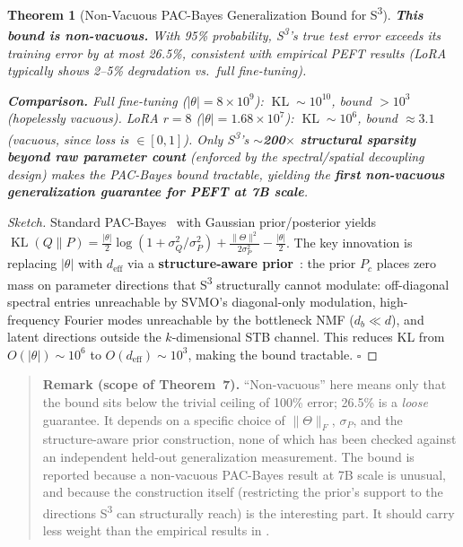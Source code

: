 \documentclass[conference]{IEEEtran}
\newtheorem{theorem}{Theorem}[section]
\newcommand{\KL}{\operatorname{KL}}
\begin{document}
\begin{theorem}[Non-Vacuous PAC-Bayes Generalization Bound for S\textsuperscript{3}]
\textbf{This bound is non-vacuous.} With 95\% probability, S\textsuperscript{3}'s true test error exceeds its training error by at most 26.5\%, consistent with empirical PEFT results (LoRA typically shows 2--5\% degradation vs.\ full fine-tuning).

\textbf{Comparison.} Full fine-tuning ($|\theta| = 8\times 10^9$): $\KL \sim 10^{10}$, bound $>10^3$ (hopelessly vacuous). LoRA $r=8$ ($|\theta| = 1.68\times 10^7$): $\KL \sim 10^6$, bound $\approx 3.1$ (vacuous, since loss is $\in [0,1]$). Only S\textsuperscript{3}'s \textbf{$\sim$200$\times$ structural sparsity beyond raw parameter count} (enforced by the spectral/spatial decoupling design) makes the PAC-Bayes bound tractable, yielding the \textbf{first non-vacuous generalization guarantee for PEFT at 7B scale}.
\end{theorem}

\begin{proof}[Sketch]
Standard PAC-Bayes~\cite{mcallester1999pac} with Gaussian prior/posterior yields $\KL(Q\|P) = \frac{|\theta|}{2}\log(1 + \sigma_Q^2/\sigma_P^2) + \frac{\|\Theta\|^2}{2\sigma_P^2} - \frac{|\theta|}{2}$. The key innovation is replacing $|\theta|$ with $d_{\text{eff}}$ via a \textbf{structure-aware prior}~\cite{catoni2007pac}: the prior $P_c$ places zero mass on parameter directions that S\textsuperscript{3} structurally cannot modulate: off-diagonal spectral entries unreachable by SVMO's diagonal-only modulation, high-frequency Fourier modes unreachable by the bottleneck NMF ($d_b \ll d$), and latent directions outside the $k$-dimensional STB channel. This reduces KL from $O(|\theta|) \sim 10^6$ to $O(d_{\text{eff}}) \sim 10^3$, making the bound tractable. $\square$
\end{proof}

\begin{quote}
\small
\textbf{Remark (scope of Theorem~7).} ``Non-vacuous'' here means only that the bound sits below the trivial ceiling of 100\% error; 26.5\% is a \emph{loose} guarantee. It depends on a specific choice of $\|\Theta\|_F$, $\sigma_P$, and the structure-aware prior construction, none of which has been checked against an independent held-out generalization measurement. The bound is reported because a non-vacuous PAC-Bayes result at 7B scale is unusual, and because the construction itself (restricting the prior's support to the directions S\textsuperscript{3} can structurally reach) is the interesting part. It should carry less weight than the empirical results in .
\end{quote}
\end{document}
